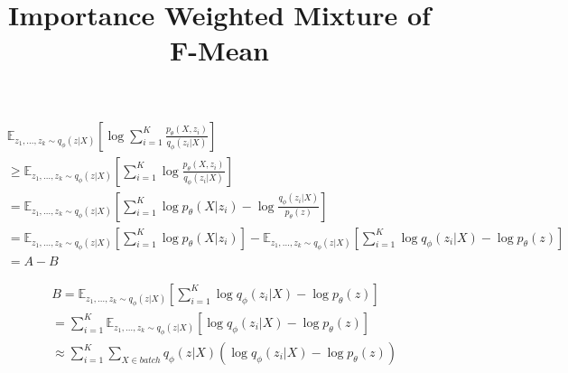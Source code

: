 \documentclass[11pt]{article}
\title{Importance Weighted Mixture of F-Mean}
\begin{document}
    \begin{equation}
        \begin{split}
            & \mathbb{E}_{z_1,\ldots,z_k \sim q_{\phi}(z|X)}\left[ \log \sum_{i=1}^{K} \frac{p_{\theta}(X, z_i)}{q_{\phi}(z_i|X)} \right]\\
            & \geq \mathbb{E}_{z_1,\ldots,z_k \sim q_{\phi}(z|X)} \left[ \sum_{i=1}^{K} \log  \frac{p_{\theta}(X, z_i)}{q_{\phi}(z_i|X)} \right]\\
            & = \mathbb{E}_{z_1,\ldots,z_k \sim q_{\phi}(z|X)} \left[ \sum_{i=1}^{K} \log p_{\theta}(X|z_i) - \log \frac{q_{\phi}(z_i| X)}{p_{\theta}(z)}\right]\\
            & = \mathbb{E}_{z_1,\ldots,z_k \sim q_{\phi}(z|X)} \left[ \sum_{i=1}^{K} \log p_{\theta}(X|z_i)\right] - \mathbb{E}_{z_1,\ldots,z_k \sim q_{\phi}(z|X)} \left[ \sum_{i=1}^{K}\log q_{\phi}(z_i| X) - \log p_{\theta}(z)\right]\\
            & = A - B
        \end{split}
    \end{equation}

    \begin{equation}
        \begin{split}
            & B = \mathbb{E}_{z_1,\ldots,z_k \sim q_{\phi}(z|X)} \left[ \sum_{i=1}^{K}\log q_{\phi}(z_i| X) - \log p_{\theta}(z)\right]\\
            & = \sum_{i=1}^{K} \mathbb{E}_{z_1,\ldots,z_k \sim q_{\phi}(z|X)} \left[ \log q_{\phi}(z_i| X) - \log p_{\theta}(z)\right]\\
            & \approx \sum_{i=1}^{K}  \sum_{X \in batch} q_{\phi}(z|X) (\log q_{\phi}(z_i| X) - \log p_{\theta}(z))
        \end{split}
    \end{equation}
\end{document}
